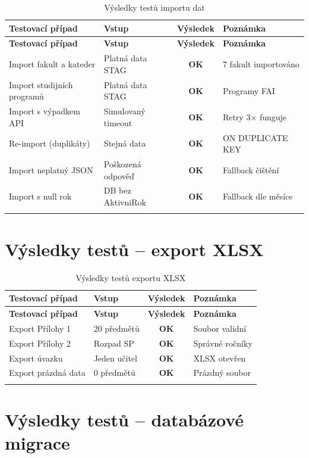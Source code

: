 \documentclass[12pt,a4paper]{report}
\begin{document}
\begin{longtable}{p{4cm}p{4cm}cp{3cm}}
\toprule
\textbf{Testovací případ} & \textbf{Vstup} & \textbf{Výsledek} & \textbf{Poznámka} \\
\midrule
\endfirsthead
\midrule
\textbf{Testovací případ} & \textbf{Vstup} & \textbf{Výsledek} & \textbf{Poznámka} \\
\midrule
\endhead
Import fakult a kateder & Platná data STAG & \textbf{OK} & 7 fakult importováno \\
Import studijních programů & Platná data STAG & \textbf{OK} & Programy FAI \\
Import s výpadkem API & Simulovaný timeout & \textbf{OK} & Retry 3× funguje \\
Re-import (duplikáty) & Stejná data & \textbf{OK} & ON DUPLICATE KEY \\
Import neplatný JSON & Poškozená odpověď & \textbf{OK} & Fallback čištění \\
Import s null rok & DB bez AktivniRok & \textbf{OK} & Fallback dle měsíce \\
\bottomrule
\caption{Výsledky testů importu dat}
\end{longtable}

\section{Výsledky testů -- export XLSX}

\begin{longtable}{p{4cm}p{4cm}cp{3cm}}
\toprule
\textbf{Testovací případ} & \textbf{Vstup} & \textbf{Výsledek} & \textbf{Poznámka} \\
\midrule
\endfirsthead
\midrule
\textbf{Testovací případ} & \textbf{Vstup} & \textbf{Výsledek} & \textbf{Poznámka} \\
\midrule
\endhead
Export Přílohy 1 & 20 předmětů & \textbf{OK} & Soubor validní \\
Export Přílohy 2 & Rozpad SP & \textbf{OK} & Správné ročníky \\
Export úvazku & Jeden učitel & \textbf{OK} & XLSX otevřen \\
Export prázdná data & 0 předmětů & \textbf{OK} & Prázdný soubor \\
\bottomrule
\caption{Výsledky testů exportu XLSX}
\end{longtable}

\section{Výsledky testů -- databázové migrace}
\end{document}
